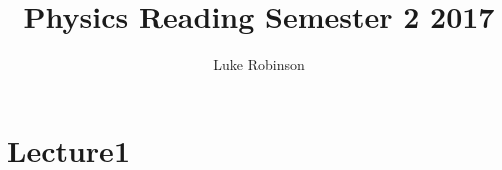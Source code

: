 \documentclass[8pt,a4paper,oneside]{article}
\title{Physics Reading Semester 2 2017}
\author{Luke Robinson}
\begin{document}
\tableofcontents{}
\section{Lecture1}

\end{document}
